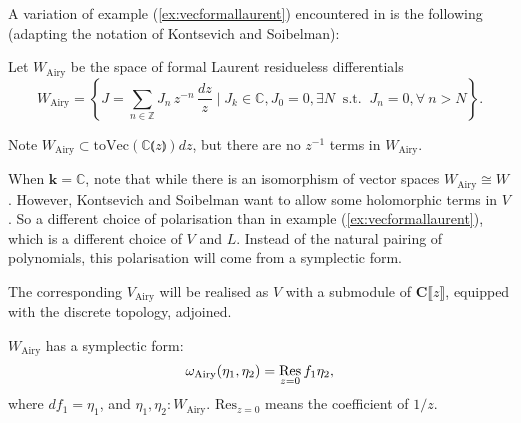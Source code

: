         A variation of example (\ref{ex:vecformallaurent}) encountered in \cite{ks_airy} is the following (adapting the notation of Kontsevich and Soibelman):
        \begin{defn} Let \(  W_{\mathrm{Airy}}\) be the space of formal Laurent residueless differentials
        \[ W_{\mathrm{Airy}}=\left\{ J=\sum_{n\in\mathbb{Z}} J_n \, z^{-n} \, \frac{dz}{z}\mid J_k \in \mathbb{C}, J_0=0, \exists N \;\; \mathrm{s.t.}\;\;  J_n=0, \forall \ n>N\right\}. \]
        \end{defn} 
        Note \( W_{\mathrm{Airy}} \subset  \mathrm{toVec} (\mathbb{C}\lParen z \rParen ) dz\), but there are no \(z^{-1}\) terms in \(W_{\mathrm{Airy}}\).

        
        When \( \mathbf{k} =\mathbb{C}\), note that while there is an isomorphism of vector spaces \(W_{\mathrm{Airy}} \cong W\). %
        However, Kontsevich and Soibelman want to allow some holomorphic terms in \(V\). So a different choice of polarisation than in example (\ref{ex:vecformallaurent}), which is a different choice of \(V\) and \(L\). Instead of the natural pairing of polynomials, this polarisation will come from a symplectic form.
        
        The corresponding \( V_{\mathrm{Airy}}\) will be realised as \(V\) with a submodule of \( \mathbf{C}\lBrack z \rBrack\), equipped with the discrete topology, adjoined.
        
        
        
        \begin{prop} \( W_{\mathrm{Airy}}\) has a symplectic form:
        \[ \omega_{\text{Airy}}(\eta_1,\eta_2)=\operatorname*{Res}_{z=0}f_1\eta_2,\] 
        where \(df_1=\eta_1\), and \( \eta_1, \eta_2: W_\text{Airy}\). \( \mathrm{Res}_{z=0} \) means the coefficient of \( 1/z\).
        \end{prop}
        
